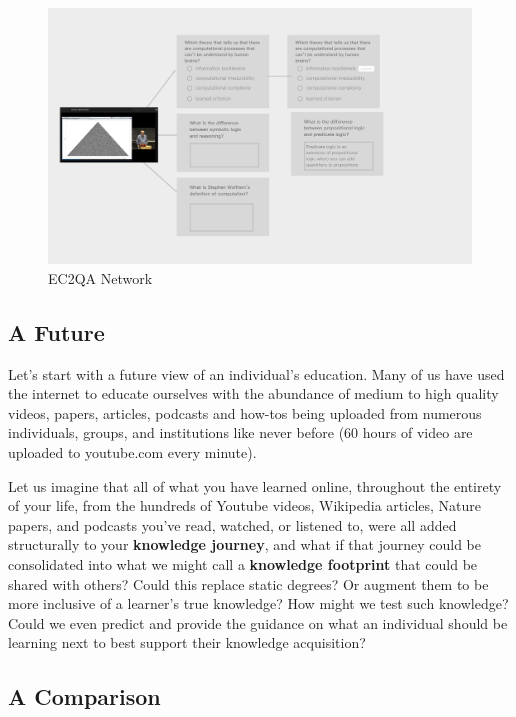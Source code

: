 \documentclass{acm_proc_article-sp}
\begin{document}
\begin{figure}
\centering
\includegraphics{img/MtoQA.png}
\caption{EC2QA Network}
\end{figure}

\subsection{A Future}\label{a-future}

Let's start with a future view of an individual's education. Many of us
have used the internet to educate ourselves with the abundance of medium
to high quality videos, papers, articles, podcasts and how-tos being
uploaded from numerous individuals, groups, and institutions like never
before (60 hours of video are uploaded to youtube.com every minute).

Let us imagine that all of what you have learned online, throughout the
entirety of your life, from the hundreds of Youtube videos, Wikipedia
articles, Nature papers, and podcasts you've read, watched, or listened
to, were all added structurally to your \textbf{knowledge journey}, and
what if that journey could be consolidated into what we might call a
\textbf{knowledge footprint} that could be shared with others? Could
this replace static degrees? Or augment them to be more inclusive of a
learner's true knowledge? How might we test such knowledge? Could we
even predict and provide the guidance on what an individual should be
learning next to best support their knowledge acquisition?

\subsection{A Comparison}\label{a-comparison}
\end{document}
